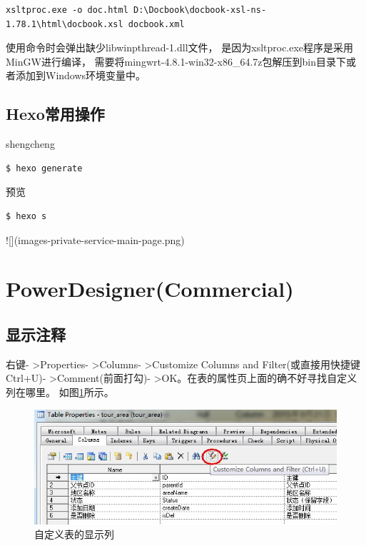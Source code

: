 \documentclass{book}
\begin{document}
\begin{lstlisting}
xsltproc.exe -o doc.html D:\Docbook\docbook-xsl-ns-1.78.1\html\docbook.xsl docbook.xml
\end{lstlisting}

使用命令时会弹出缺少libwinpthread-1.dll文件，
是因为xsltproc.exe程序是采用MinGW进行编译，
需要将mingwrt-4.8.1-win32-x86\_64.7z包解压到bin目录下或者添加到Windows环境变量中。

\subsection{Hexo常用操作}

shengcheng

\begin{lstlisting}[language=Bash]
$ hexo generate
\end{lstlisting}

预览

\begin{lstlisting}[language=Bash]
$ hexo s
\end{lstlisting}

![](images\maven-private-service\nexus-main-page.png)

\section{PowerDesigner(Commercial)}

\subsection{显示注释}

右键- >Properties- >Columns- >Customize Columns and Filter(或直接用快捷键Ctrl+U)- >Comment(前面打勾)- >OK。在表的属性页上面的确不好寻找自定义列在哪里。
如图\ref{fig:CustomColumnsAndFilter}所示。

\begin{figure}[htbp]
	\centering
	\includegraphics[scale=0.8]{CustomColumnsAndFilter.jpg}
	\caption{自定义表的显示列}
	\label{fig:CustomColumnsAndFilter}
\end{figure}
\end{document}
